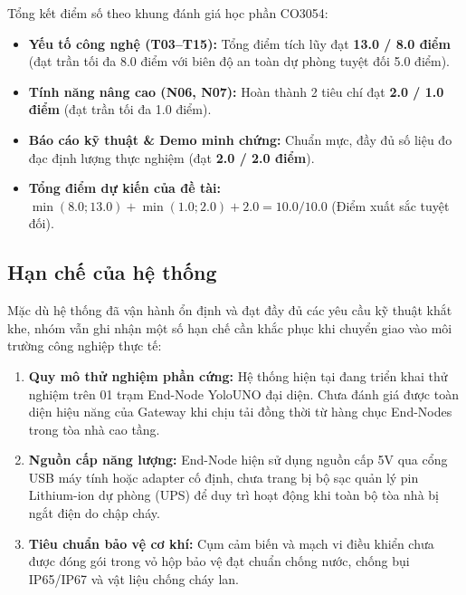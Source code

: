Tổng kết điểm số theo khung đánh giá học phần CO3054:
\begin{itemize}
    \item \textbf{Yếu tố công nghệ (T03--T15):} Tổng điểm tích lũy đạt \textbf{13.0 / 8.0 điểm} (đạt trần tối đa 8.0 điểm với biên độ an toàn dự phòng tuyệt đối 5.0 điểm).
    \item \textbf{Tính năng nâng cao (N06, N07):} Hoàn thành 2 tiêu chí đạt \textbf{2.0 / 1.0 điểm} (đạt trần tối đa 1.0 điểm).
    \item \textbf{Báo cáo kỹ thuật \& Demo minh chứng:} Chuẩn mực, đầy đủ số liệu đo đạc định lượng thực nghiệm (đạt \textbf{2.0 / 2.0 điểm}).
    \item \textbf{Tổng điểm dự kiến của đề tài:} $\min(8.0; 13.0) + \min(1.0; 2.0) + 2.0 = \mathbf{10.0 / 10.0}$ (Điểm xuất sắc tuyệt đối).
\end{itemize}

\subsection{Hạn chế của hệ thống}
Mặc dù hệ thống đã vận hành ổn định và đạt đầy đủ các yêu cầu kỹ thuật khắt khe, nhóm vẫn ghi nhận một số hạn chế cần khắc phục khi chuyển giao vào môi trường công nghiệp thực tế:
\begin{enumerate}
    \item \textbf{Quy mô thử nghiệm phần cứng:} Hệ thống hiện tại đang triển khai thử nghiệm trên 01 trạm End-Node YoloUNO đại diện. Chưa đánh giá được toàn diện hiệu năng của Gateway khi chịu tải đồng thời từ hàng chục End-Nodes trong tòa nhà cao tầng.
    \item \textbf{Nguồn cấp năng lượng:} End-Node hiện sử dụng nguồn cấp 5V qua cổng USB máy tính hoặc adapter cố định, chưa trang bị bộ sạc quản lý pin Lithium-ion dự phòng (UPS) để duy trì hoạt động khi toàn bộ tòa nhà bị ngắt điện do chập cháy.
    \item \textbf{Tiêu chuẩn bảo vệ cơ khí:} Cụm cảm biến và mạch vi điều khiển chưa được đóng gói trong vỏ hộp bảo vệ đạt chuẩn chống nước, chống bụi IP65/IP67 và vật liệu chống cháy lan.
\end{enumerate}

